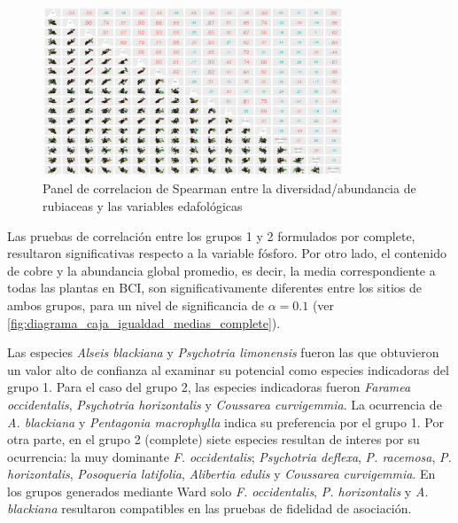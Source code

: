 \documentclass[11pt,]{article}
\begin{document}
\begin{figure}
\centering
\includegraphics[width=0.80000\textwidth]{panel_cor_suelo_abun_riq_rubic_spear.png}
\caption{Panel de correlacion de Spearman entre la diversidad/abundancia
de rubiaceas y las variables edafológicas
\label{fig:panel_cor_suelo_abun_riq_rubic_spear}}
\end{figure}

Las pruebas de correlación entre los grupos 1 y 2 formulados por
complete, resultaron significativas respecto a la variable fósforo. Por
otro lado, el contenido de cobre y la abundancia global promedio, es
decir, la media correspondiente a todas las plantas en BCI, son
significativamente diferentes entre los sitios de ambos grupos, para un
nivel de significancia de \(\alpha= 0.1\) (ver
\ref{fig:diagrama_caja_igualdad_medias_complete}).

Las especies \emph{Alseis blackiana} y \emph{Psychotria limonensis}
fueron las que obtuvieron un valor alto de confianza al examinar su
potencial como especies indicadoras del grupo 1. Para el caso del grupo
2, las especies indicadoras fueron \emph{Faramea occidentalis},
\emph{Psychotria horizontalis} y \emph{Coussarea curvigemmia}. La
ocurrencia de \emph{A. blackiana} y \emph{Pentagonia macrophylla} indica
su preferencia por el grupo 1. Por otra parte, en el grupo 2 (complete)
siete especies resultan de interes por su ocurrencia: la muy dominante
\emph{F. occidentalis}; \emph{Psychotria deflexa}, \emph{P. racemosa},
\emph{P. horizontalis}, \emph{Posoqueria latifolia}, \emph{Alibertia
edulis} y \emph{Coussarea curvigemmia}. En los grupos generados mediante
Ward solo \emph{F. occidentalis}, \emph{P. horizontalis} y \emph{A.
blackiana} resultaron compatibles en las pruebas de fidelidad de
asociación.
\end{document}
